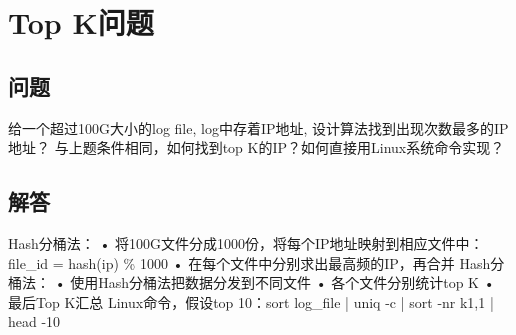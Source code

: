 \documentclass[UTF8]{ctexart}
\begin{document}
\section{Top K问题}
\subsection{问题}
给一个超过100G大小的log file, log中存着IP地址, 设计算法找到出现次数最多的IP地址？
与上题条件相同，如何找到top K的IP？如何直接用Linux系统命令实现？
\subsection{解答}
Hash分桶法： 
• 将100G文件分成1000份，将每个IP地址映射到相应文件中：file\_id = hash(ip) \% 1000 
• 在每个文件中分别求出最高频的IP，再合并 Hash分桶法： 
• 使用Hash分桶法把数据分发到不同文件 
• 各个文件分别统计top K 
• 最后Top K汇总 
Linux命令，假设top 10：sort log\_file | uniq -c | sort -nr k1,1 | head -10
\end{document}
